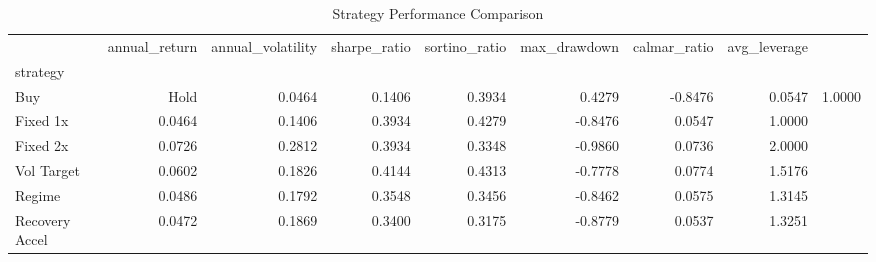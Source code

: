 \begin{table}
\caption{Strategy Performance Comparison}
\label{tab:performance}
\begin{tabular}{lrrrrrrr}
\toprule
 & annual_return & annual_volatility & sharpe_ratio & sortino_ratio & max_drawdown & calmar_ratio & avg_leverage \\
strategy &  &  &  &  &  &  &  \\
\midrule
Buy & Hold & 0.0464 & 0.1406 & 0.3934 & 0.4279 & -0.8476 & 0.0547 & 1.0000 \\
Fixed 1x & 0.0464 & 0.1406 & 0.3934 & 0.4279 & -0.8476 & 0.0547 & 1.0000 \\
Fixed 2x & 0.0726 & 0.2812 & 0.3934 & 0.3348 & -0.9860 & 0.0736 & 2.0000 \\
Vol Target & 0.0602 & 0.1826 & 0.4144 & 0.4313 & -0.7778 & 0.0774 & 1.5176 \\
Regime & 0.0486 & 0.1792 & 0.3548 & 0.3456 & -0.8462 & 0.0575 & 1.3145 \\
Recovery Accel & 0.0472 & 0.1869 & 0.3400 & 0.3175 & -0.8779 & 0.0537 & 1.3251 \\
\bottomrule
\end{tabular}
\end{table}
